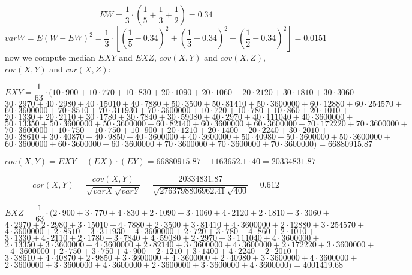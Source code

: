 \documentclass[11pt,twoside,a4paper]{book}
\begin{document}
$$EW = \frac{1}{3}\cdot \left(\frac{1}{5} +  \frac{1}{3} +
\frac{1}{2}\right)=0.34$$ 
$$varW=E(W-EW)^2=\frac{1}{3}\cdot [\left(\frac{1}{5} - 
0.34\right)^2+\left(\frac{1}{3} - 0.34\right)^2+\left(\frac{1}{2} - 
0.34\right)^2]=0.0151$$ 
now we compute median $EXY$ and $EXZ$, $cov(X,Y)$ and $cov(X,Z)$, $cor(X,Y)$
and $cor(X,Z)$:

$$EXY= \frac{1}{63}\cdot(10\cdot 900  + 10\cdot  770  + 10\cdot  830 +
20 \cdot  1090+ 20 \cdot   1060+ 20 \cdot  2120  +30 \cdot   1810 +30\cdot  
 3060+$$ $$30 \cdot  2970 +40\cdot 
2980 +40\cdot  15010 +40\cdot 7880 +50\cdot  3500
+50\cdot   81410 +50\cdot 3600000+60\cdot  12880
 +60\cdot  254570 +$$ $$60\cdot   3600000  +70\cdot  8510
+70\cdot   311930 +70\cdot 3600000 +10\cdot 720
 +10\cdot 780 +10\cdot  860 + 20 \cdot 1010+$$
 $$20\cdot   1330  +20\cdot  2110
+30\cdot   1780 +30\cdot  7840 +30\cdot 59080
 +40\cdot 2970 +40\cdot  111040 + 40 \cdot  3600000+$$
 $$50\cdot  13350  +50\cdot 3600000
+50\cdot 3600000 +60\cdot  82140 +60\cdot 3600000
 +60\cdot  3600000 +70\cdot  172220 + 70 \cdot  3600000+$$
 $$70\cdot  3600000  +10\cdot 750
+10\cdot  750 +10\cdot  900 +20\cdot 1210
 +20\cdot 1400 +20\cdot   2240 + 30 \cdot  2010+$$
 $$30\cdot   38610  +30\cdot  40870
+40\cdot  9850 +40\cdot   3600000 +40\cdot  3600000
 +50\cdot 40980 +50\cdot   3600000 + 50 \cdot  3600000+$$
$$60\cdot  3600000  +60\cdot  3600000
+60\cdot 3600000  +70\cdot 3600000 +70\cdot  3600000
 +70\cdot   3600000)=66880915.87$$

$$cov\left(X,Y\right)=EXY-\left(EX\right)\cdot \left(EY\right)=66880915.87
-1163652.1\cdot 40= 20334831.87$$

$$cor(X,Y)=\frac{cov(X,Y)}{\sqrt{varX}\sqrt{varY}}=\frac{20334831.87}{\sqrt{2763798806962.41}\sqrt{400}}=0.612$$

$$EXZ= \frac{1}{63}\cdot(2\cdot 900  + 3\cdot  770  + 4\cdot  830 +
2 \cdot  1090+ 3 \cdot   1060+ 4 \cdot  2120  +2 \cdot   1810 +3\cdot  
 3060+$$ $$4 \cdot  2970 +2\cdot 
2980 +3\cdot  15010 +4\cdot 7880 +2\cdot  3500
+3\cdot   81410 +4\cdot 3600000+2\cdot  12880
 +3\cdot  254570 +$$ $$4\cdot   3600000  +2\cdot  8510
+3\cdot   311930 +4\cdot 3600000 +2\cdot 720
 +3\cdot 780 +4\cdot  860 + 2 \cdot 1010+$$
 $$3\cdot   1330  +4\cdot  2110
+2\cdot   1780 +3\cdot  7840 +4\cdot 59080
 +2\cdot 2970 +3\cdot  111040 + 4 \cdot  3600000+$$
 $$2\cdot  13350  +3\cdot 3600000
+4\cdot 3600000 +2\cdot  82140 +3\cdot 3600000
 +4\cdot  3600000 +2\cdot  172220 + 3 \cdot  3600000+$$
 $$4\cdot  3600000  +2\cdot 750
+3\cdot  750 +4\cdot  900 +2\cdot 1210
 +3\cdot 1400 +4\cdot   2240 + 2 \cdot  2010+$$
 $$3\cdot   38610  +4\cdot  40870
+2\cdot  9850 +3\cdot   3600000 +4\cdot  3600000
 +2\cdot 40980 +3\cdot   3600000 + 4 \cdot  3600000+$$
$$2\cdot  3600000  +3\cdot  3600000
+4\cdot 3600000  +2\cdot 3600000 +3\cdot  3600000
 +4\cdot   3600000)=4001419.68$$
\end{document}
